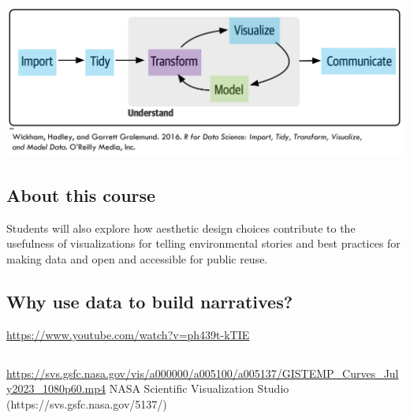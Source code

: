 \documentclass[
  letterpaper,
  DIV=11,
  numbers=noendperiod]{scrartcl}
\begin{document}
\hypertarget{section}{%
\subsection{}\label{section}}

\includegraphics{InClassStatic/dataSciencePipeline.png}

\hypertarget{about-this-course-1}{%
\subsection{About this course}\label{about-this-course-1}}

Students will also explore how aesthetic design choices contribute to
the usefulness of visualizations for telling environmental stories and
best practices for making data and open and accessible for public reuse.

\hypertarget{why-use-data-to-build-narratives}{%
\subsection{Why use data to build
narratives?}\label{why-use-data-to-build-narratives}}

\url{https://www.youtube.com/watch?v=ph439t-kTIE}

\hypertarget{section-1}{%
\subsection{}\label{section-1}}

\url{https://svs.gsfc.nasa.gov/vis/a000000/a005100/a005137/GISTEMP_Curves_July2023_1080p60.mp4}
NASA Scientific Visualization Studio (https://svs.gsfc.nasa.gov/5137/)

\hypertarget{section-2}{%
\subsection{}\label{section-2}}
\end{document}
